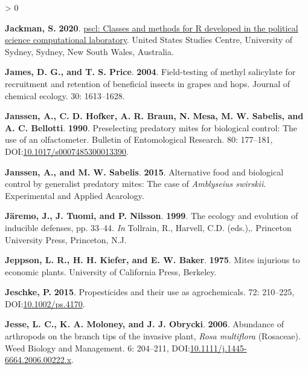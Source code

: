 \documentclass{ufdissertation}[overrideChapters] %
\newlength{\cslhangindent}
\newenvironment{CSLReferences}[2] %
 {%
  \setlength{\parindent}{0pt}
  \ifodd #1 \everypar{\setlength{\hangindent}{\cslhangindent}}\ignorespaces\fi
  \ifnum #2 > 0
  \setlength{\parskip}{#2\baselineskip}
  \fi
 }%
 {}
\begin{document}
{\begin{CSLReferences}{1}{1}
\leavevmode{}%
\textbf{Jackman, S.} \textbf{2020}. \href{https://github.com/atahk/pscl/}{{pscl}: Classes and methods for {R} developed in the political science computational laboratory}. United States Studies Centre, University of Sydney, Sydney, New South Wales, Australia.

\leavevmode{}%
\textbf{James, D. G., and T. S. Price}. \textbf{2004}. Field-testing of methyl salicylate for recruitment and retention of beneficial insects in grapes and hops. Journal of chemical ecology. 30: 1613--1628.

\leavevmode{}%
\textbf{Janssen, A., C. D. Hofker, A. R. Braun, N. Mesa, M. W. Sabelis, and A. C. Bellotti}. \textbf{1990}. Preselecting predatory mites for biological control: The use of an olfactometer. Bulletin of Entomological Research. 80: 177--181, DOI:\href{https://doi.org/10.1017/s0007485300013390}{10.1017/s0007485300013390}.

\leavevmode{}%
\textbf{Janssen, A., and M. W. Sabelis}. \textbf{2015}. Alternative food and biological control by generalist predatory mites: The case of {\emph{Amblyseius swirskii}}. Experimental and Applied Acarology.

\leavevmode{}%
\textbf{Järemo, J., J. Tuomi, and P. Nilsson}. \textbf{1999}. The ecology and evolution of inducible defenses, pp. 33--44. \emph{In} Tollrain, R., Harvell, C.D. (eds.),. Princeton University Press, Princeton, N.J.

\leavevmode{}%
\textbf{Jeppson, L. R., H. H. Kiefer, and E. W. Baker}. \textbf{1975}. Mites injurious to economic plants. University of California Press, Berkeley.

\leavevmode{}%
\textbf{Jeschke, P.} \textbf{2015}. Propesticides and their use as agrochemicals. 72: 210--225, DOI:\href{https://doi.org/10.1002/ps.4170}{10.1002/ps.4170}.

\leavevmode{}%
\textbf{Jesse, L. C., K. A. Moloney, and J. J. Obrycki}. \textbf{2006}. Abundance of arthropods on the branch tips of the invasive plant, {\emph{Rosa multiflora}} ({Rosaceae}). Weed Biology and Management. 6: 204--211, DOI:\href{https://doi.org/10.1111/j.1445-6664.2006.00222.x}{10.1111/j.1445-6664.2006.00222.x}.


\end{CSLReferences}}
\end{document}
